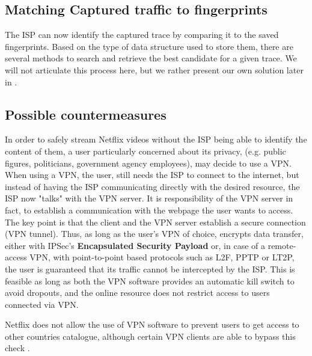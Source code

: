 \subsection{Matching Captured traffic to fingerprints}

The ISP can now identify the captured trace by comparing it to the saved
fingerprints.  Based on the type of data structure used to store them, there
are several methods to search and retrieve the best candidate for a given
trace. We will not articulate this process here, but we rather present our own
solution later in .

\subsection{Possible countermeasures}\label{sec:vpn}

In order to safely stream Netflix videos without the ISP being able to identify
the content of them, a user particularly concerned about its privacy, (e.g.
public figures, politicians, government agency employees), may decide to use a
VPN. When using a VPN, the user, still needs the ISP to connect to the
internet, but instead of having the ISP communicating directly with the desired
resource, the ISP now "talks" with the VPN server. It is responsibility of the
VPN server in fact, to establish a communication with the webpage the user
wants to access.  The key point is that the client and the VPN server establish
a secure connection (VPN tunnel). Thus, as long as the user's VPN of choice,
encrypts data transfer, either with IPSec's \textbf{Encapsulated Security
Payload} or, in case of a remote-access VPN, with point-to-point based
protocols such as L2F, PPTP or LT2P, the user is guaranteed that its traffic
cannot be intercepted by the ISP. This is feasible as long as both the VPN
software provides an automatic kill switch to avoid dropouts, and the online
resource does not restrict access to users connected via VPN. 

Netflix does not allow the use of VPN software to prevent users to get access
to other countries catalogue, although certain VPN clients are able to bypass
this check \cite{nordvpn}.
